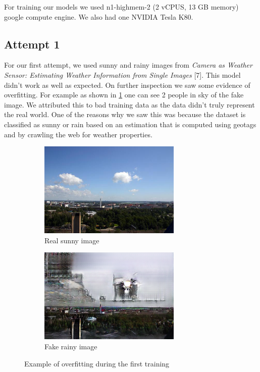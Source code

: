 \documentclass{article}
\begin{document}
For training our models we used n1-highmem-2 (2 vCPUS, 13 GB memory) google compute engine. We also had one NVIDIA Tesla K80.

\subsection{Attempt 1}

For our first attempt, we used sunny and rainy images from \textit{Camera as Weather Sensor: Estimating Weather Information from Single Images} [7]. This model didn't work as well as expected. On further inspection we saw some evidence of overfitting. For example as shown in \ref{fig:v1_failure} one can see 2 people in sky of the fake image. We attributed this to bad training data as the data didn't truly represent the real world. One of the reasons why we saw this was because the dataset is classified as sunny or rain based on an estimation that is computed using geotags and by crawling the web for weather properties. 

\begin{figure}[H]
	\begin{subfigure}{.5\textwidth}
		\centering
		\includegraphics[width=.9\linewidth]{images/v1_real_A.png}
		\caption{Real sunny image}
	\end{subfigure}
	\begin{subfigure}{.5\textwidth}
		\centering
		\includegraphics[width=.9\linewidth]{images/v1_fake_B.png}
		\caption{Fake rainy image}
	\end{subfigure}
	\caption{Example of overfitting during the first training}
	\label{fig:v1_failure}
\end{figure}
\end{document}
